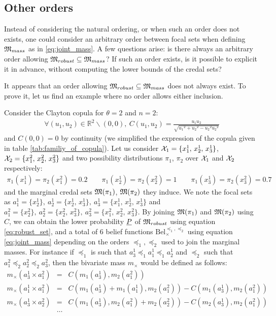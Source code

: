 \subsection{Other orders}
Instead of considering the natural ordering, or when such an order does not exists, one could consider an arbitrary order between focal sets when defining ${\mathfrak{M}}_{mass}$ as in \eqref{eq:joint_mass}. A few questions arise: is there always an arbitrary order allowing ${\mathfrak{M}}_{robust}\subseteq{\mathfrak{M}}_{mass}$? If such an order exists, is it possible to explicit it in advance, \ie without computing the lower bounds of the credal sets?

It appears that an order allowing ${\mathfrak{M}}_{robust}\subseteq{\mathfrak{M}}_{mass}$ does not always exist. To prove it, let us find an example where no order allows either inclusion.

\begin{example}
Consider the Clayton copula for $\theta=2$ and $n=2$:
\begin{eqnarray*}
    \forall (u_1,u_2)\in\mathbb{R}^2\backslash(0,0), ~C(u_1,u_2)=\frac{u_1u_2}{\sqrt{{u_1}^2+{u_2}^2-{u_2}^2{u_2}^2}}
\end{eqnarray*}
and $C(0,0)=0$ by continuity (we simplified the expression of the copula given in table \ref{tab:familiy_of_copula}). Let us consider ${\mathcal{X}}_1=\{x^1_1,\, x^1_2,\, x^1_3\}$, ${\mathcal{X}}_2=\{x^2_1,\, x^2_2,\, x^2_3\}$ and two possibility distributions $\pi_1$, $\pi_2$ over ${\mathcal{X}}_1$ and ${\mathcal{X}}_2$ respectively:
\begin{eqnarray*}
    \pi_1(x^1_1)=\pi_2(x^2_1)=0.2 \qquad \pi_1(x^1_2)=\pi_2(x^2_2)=1 \qquad \pi_1(x^1_3)=\pi_2(x^2_3)=0.7 
\end{eqnarray*}
and the marginal credal sets ${\mathfrak{M}}(\pi_1)$, ${\mathfrak{M}}(\pi_2)$ they induce. We note the focal sets as $a^1_1=\{x^1_2\},~a^1_2=\{x^1_2,\, x^1_3\},~a^1_3=\{x^1_1,\,x^1_2,\,x^1_3\}$ and $a^2_1=\{x^2_2\},~a^2_2=\{x^2_2,\, x^2_3\},~a^2_3=\{x^2_1,\, x^2_2,\, x^2_3\}$. By joining ${\mathfrak{M}}(\pi_1)$ and ${\mathfrak{M}}(\pi_2)$ using $C$, we can obtain the lower probability ${\underline{P}}$ of ${\mathfrak{M}}_{robust}$ using equation \eqref{eq:robust_set}, and a total of 6 belief functions $\mathrm{Bel}^{\preceq_1,\preceq_2}_\times$ using equation \eqref{eq:joint_mass} depending on the orders $\preceq_1, \preceq_2$ used to join the marginal masses. For instance if $\preceq_1$ is such that $a^1_3\preceq_1 a^1_1 \preceq_1 a^1_2$ and $\preceq_2$ such that $a^2_1 \preceq_2 a^2_2 \preceq_2 a^2_3$, then the bivariate mass $m_\times$ would be defined as follows:
\begin{eqnarray*}
    m_\times(a^1_3\times a^2_1) &=& C(m_1(a^1_3), m_2(a^2_1))\\
    m_\times(a^1_1\times a^2_1) &=& C(m_1(a^1_3)+m_1(a^1_1), m_2(a^2_1)) - C(m_1(a^1_3), m_2(a^2_1))\\
    m_\times(a^1_3\times a^2_2) &=& C(m_1(a^1_3), m_2(a^2_1) + m_2(a^2_2)) - C(m_2(a^1_3), m_2(a^2_1))\\
    &\dots&
\end{eqnarray*}


\end{example}

